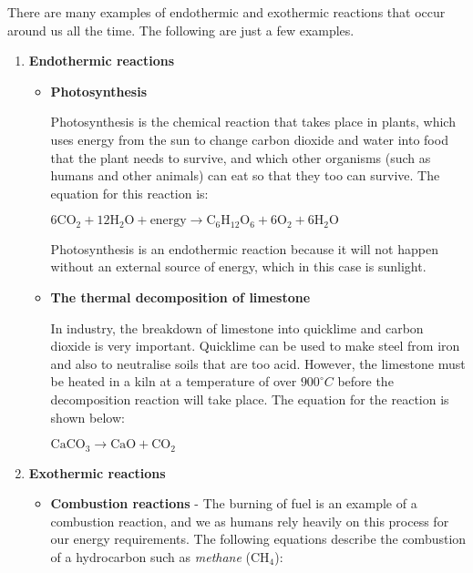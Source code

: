 There are many examples of endothermic and exothermic reactions that occur around us all the time. The following are just a few examples.

\begin{enumerate}
\item \textbf{Endothermic reactions}
  \begin{itemize}
  \item \textbf{Photosynthesis}

    Photosynthesis is the chemical reaction that takes place in
    plants, which uses energy from the sun to change carbon dioxide
    and water into food that the plant needs to survive, and which
    other organisms (such as humans and other animals) can eat so that
    they too can survive. The equation for this reaction is:

    \begin{center}
      $6\text{CO}_2 + 12\text{H}_2\text{O} + \text{energy} \rightarrow \text{C}_6\text{H}_{12}\text{O}_6 + 6\text{O}_2 + 6\text{H}_2\text{O}$
    \end{center}

    Photosynthesis is an endothermic reaction because it will not
    happen without an external source of energy, which in this case is
    sunlight.

  \item \textbf{The thermal decomposition of limestone}

    In industry, the breakdown of limestone into quicklime and carbon
    dioxide is very important. Quicklime can be used to make steel
    from iron and also to neutralise soils that are too acid. However,
    the limestone must be heated in a kiln at a temperature of over
    $900^{\circ}C$ before the decomposition reaction will take
    place. The equation for the reaction is shown below:

    \begin{center}
      $\text{CaCO}_{3} \rightarrow  \text{CaO} +  \text{CO}_{2}$
    \end{center}

  \end{itemize}

\item \textbf{Exothermic reactions}

  \begin{itemize}
  \item \textbf{Combustion reactions} - The burning of fuel is an
    example of a combustion reaction, and we as humans rely heavily on
    this process for our energy requirements. The following equations
    describe the combustion of a hydrocarbon such as \textit{methane}
    (CH$_{4}$):


\end{itemize}
\end{enumerate}
